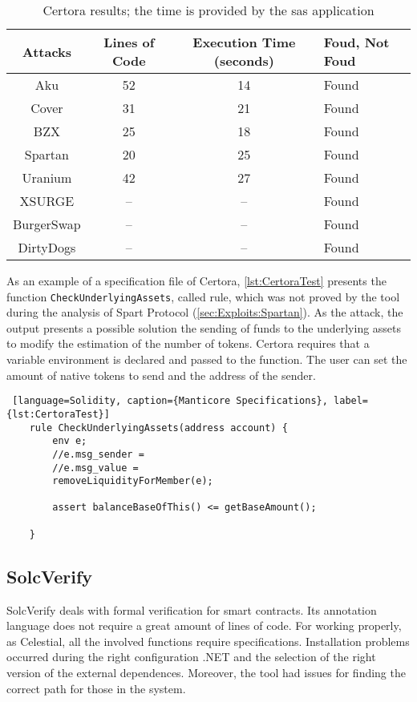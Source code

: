 \begin{center}
    \begin{table*}
        \caption{Certora results; the time is provided by the sas application}
            \label{tab:CertoraTable}
            \begin{tabular}{cccl}
            \toprule
                Attacks & Lines of Code & Execution Time (seconds) & Foud, Not Foud\\
                \midrule
                Aku & 52 & 14 & Found \\ 
                Cover & 31 & 21 & Found\\ 
                BZX & 25  & 18 & Found\\ 
                Spartan & 20  & 25 & Found\\ 
                Uranium & 42 & 27  & Found\\ 
                XSURGE &  -- & -- & Found\\  
                BurgerSwap &  -- & --& Found\\ 
                DirtyDogs &  -- & -- & Found\\
            \bottomrule
            \end{tabular}
    \end{table*}
\end{center}

As an example of a specification file of Certora, \autoref{lst:CertoraTest} presents the function \texttt{CheckUnderlyingAssets}, called rule, which was not proved by the tool during the analysis of Spart Protocol (\autoref{sec:Exploits:Spartan}).
As the attack, the output presents a possible solution the sending of funds to the underlying assets to modify the estimation of the number of tokens. 
Certora requires that a variable environment is declared and passed to the function. 
The user can set the amount of native tokens to send and the address of the sender.

\begin{lstlisting} [language=Solidity, caption={Manticore Specifications}, label={lst:CertoraTest}]
    rule CheckUnderlyingAssets(address account) {
        env e;
        //e.msg_sender = 
        //e.msg_value = 
        removeLiquidityForMember(e);
    
        assert balanceBaseOfThis() <= getBaseAmount();
    
    }
\end{lstlisting} 

\subsection*{SolcVerify} SolcVerify deals with formal verification for smart contracts.
Its annotation language does not require a great amount of lines of code.
For working properly, as Celestial, all the involved functions require specifications.
Installation problems occurred during the right configuration .NET and the selection of the right version of the external dependences.
Moreover, the tool had issues for finding the correct path for those in the system.

